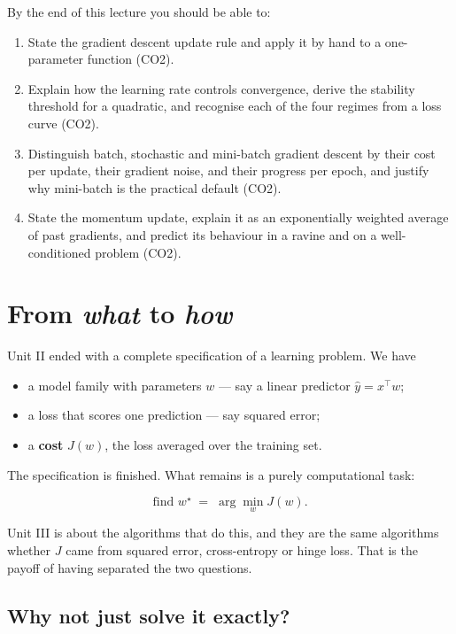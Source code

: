 \documentclass[11pt]{article}
\begin{document}
By the end of this lecture you should be able to:

\begin{enumerate}[leftmargin=*]
  \item State the gradient descent update rule and apply it by hand to a
    one-parameter function (CO2).
  \item Explain how the learning rate controls convergence, derive the
    stability threshold for a quadratic, and recognise each of the four
    regimes from a loss curve (CO2).
  \item Distinguish batch, stochastic and mini-batch gradient descent by their
    cost per update, their gradient noise, and their progress per epoch, and
    justify why mini-batch is the practical default (CO2).
  \item State the momentum update, explain it as an exponentially weighted
    average of past gradients, and predict its behaviour in a ravine and on a
    well-conditioned problem (CO2).
\end{enumerate}

\newpage
\section{From \emph{what} to \emph{how}}
\label{sec:why}

Unit II ended with a complete specification of a learning problem. We have

\begin{itemize}[leftmargin=*]
  \item a model family with parameters $w$ --- say a linear predictor
    $\hat{y} = x^\top w$;
  \item a loss that scores one prediction --- say squared error;
  \item a \textbf{cost} $J(w)$, the loss averaged over the training set.
\end{itemize}

The specification is finished. What remains is a purely computational task:

\[
  \text{find } w^\star \;=\; \arg\min_{w} J(w).
\]

Unit III is about the algorithms that do this, and they are the same algorithms
whether $J$ came from squared error, cross-entropy or hinge loss. That is the
payoff of having separated the two questions.

\subsection{Why not just solve it exactly?}
\end{document}
